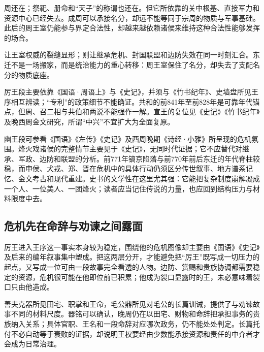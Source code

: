 周还在；祭祀、册命和“天子”的称谓也还在。但它所依靠的关中根基、直接军力和资源中心已经失去。成周可以承接名分，却远不能等同于宗周的物质与军事基础。此后的周王室仍能参与界定合法性，却越来越依赖诸侯来维持这种合法性能够发挥的场合。

\begin{causalchain}[从共和到东迁]
让王室权威的裂缝显形；则让继承危机、封国联盟和边防失效在同一时刻汇合。东迁不是一场搬家，而是统治能力的重心转移：周王室保住了名分，却失去了支配名分的物质底座。
\end{causalchain}

\begin{sourcenote}[传说、王年与政治过程]
厉王段主要依靠《国语·周语上》与《史记》，并须与《竹书纪年》、史墙盘所见王序相互辨读；“专利”的政策细节不能确证。共和的前841年至前828年是可靠年代锚点，但周、召二相与共伯和两说不能强作一解。宣王的复位见《史记》《竹书纪年》及晚西周金文研究，所谓“中兴”不宜扩大为全面复原。

幽王段可参看《国语》《左传》《史记》及西周晚期《诗经·小雅》所呈现的危机氛围。烽火戏诸侯的完整情节主要见于《史记》，无同时代证据；它不应替代对继承、军政、边防和联盟的分析。前771年镐京陷落与前770年前后东迁的年代脊柱较稳，而申侯、犬戎、郑、晋在危机中的具体行动仍须区分传世叙事、地方谱系记忆、金文考古和现代重建。史书的文学性在这里尤其强：它能把复杂制度崩解凝成一个人、一位美人、一团烽火；读者应当记住传说的力量，也应回到结构压力与材料限度中去。
\end{sourcenote}

\subsection{危机先在命辞与劝谏之间露面}

厉王进入王序这一事实本身较为稳定，围绕他的危机图像却主要由《国语》《史记》及后来的编年叙事集中塑成。把这两层分开，才能避免把“厉王”既写成一切压力的起点，又写成一位可由一段故事完全看透的人物。边防、赏赐和贵族协调都需要稳定的资源，危机很可能在他即位前已积累；他成为裂口显露时的王，未必意味着裂口只由他造成。

善夫克器所见田宅、职掌和王命，毛公鼎所见对毛公的长篇训诫，提供了与劝谏故事不同的材料尺度。器铭可以确认，晚周仍在以田宅、财物和命辞把承担事务的贵族纳入关系；具体官职、王名和一段命辞对应哪次政务，仍不能处处判定。长篇托付不必自动等于衰败的证据，却说明王权要经由少数能承接资源和责任的中介者才会成为日常治理。

